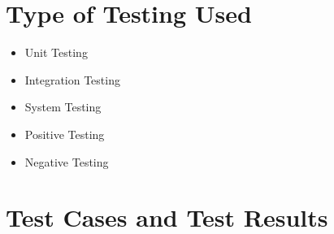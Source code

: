 \documentclass[12pt,a4paper,final]{report}
\begin{document}
\section{Type of Testing Used}
\begin{itemize}
\item Unit Testing
\item Integration Testing
\item System Testing
\item Positive Testing
\item Negative Testing
\end{itemize}


\section{Test Cases and Test Results}
\end{document}
